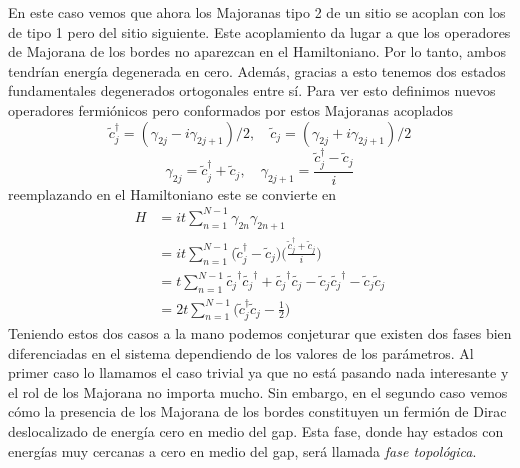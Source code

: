     En este caso vemos que ahora los Majoranas tipo 2 de un sitio se acoplan con los de tipo 1 pero del sitio siguiente. Este acoplamiento da lugar a que los operadores de Majorana de los bordes no aparezcan en el Hamiltoniano. Por lo tanto, ambos tendr\'{i}an energ\'{i}a degenerada en cero. Adem\'{a}s, gracias a esto tenemos dos estados fundamentales degenerados ortogonales entre s\'{i}. Para ver esto definimos nuevos operadores fermi\'{o}nicos pero conformados por estos Majoranas acoplados
    \begin{equation}
        \tilde c^\dagger_j=(\gamma_{2j}-i\gamma_{2j+1})/2,\quad \tilde c_j = (\gamma_{2j}+i\gamma_{2j+1})/2
    \end{equation}
    \begin{equation}
        \gamma_{2j}=\tilde c_j^\dagger+\tilde c_j,\quad \gamma_{2j+1}=\frac{\tilde c_j^\dagger-\tilde c_j}{i}
    \end{equation}
    reemplazando en el Hamiltoniano este se convierte en
    \begin{equation}
        \begin{split}
            H&=it\sum_{n=1}^{N-1}\gamma_{2n}\gamma_{2n+1}\\
            &=it\sum_{n=1}^{N-1}\Big(\tilde c^\dagger_j - \tilde c_j \Big)\Big(\frac{\tilde c^\dagger_j + \tilde c_j}{i} \Big)\\
            &=t\sum_{n=1}^{N-1} \tilde{c_j}^\dagger\tilde{c_j}^\dagger+ \tilde{c_j}^\dagger\tilde{c_j}- \tilde c_j \tilde{c_j}^\dagger-\tilde c_j \tilde c_j\\
            &=2t\sum_{n=1}^{N-1}\Big(\tilde c_j^\dagger \tilde c_j - \frac{1}{2}\Big)
        \end{split}
        \label{hammy_kitaev_topo}
    \end{equation}
Teniendo estos dos casos a la mano podemos conjeturar que existen dos fases bien diferenciadas en el sistema dependiendo de los valores de los par\'{a}metros. Al primer caso lo llamamos el caso trivial ya que no est\'{a} pasando nada interesante y el rol de los Majorana no importa mucho. Sin embargo, en el segundo caso vemos c\'{o}mo la presencia de los Majorana de los bordes constituyen un fermi\'{o}n de Dirac deslocalizado de energ\'{i}a cero en medio del gap. Esta fase, donde hay estados con energ\'{i}as muy cercanas a cero en medio del gap, ser\'{a} llamada \emph{fase topol\'{o}gica}.
%
%
%

